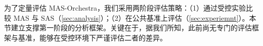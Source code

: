 
为了定量评估 MAS-Orchestra，我们采用两阶段评估策略：（1）通过受控实验比较 MAS 与 SAS（\cref{sec:analysis}）；（2）在公共基准上评估（\cref{sec:experiemnt}）。本节建立支撑第一阶段的分析框架。关键在于，据我们所知，此前尚无专门的评估框架与基准，能够在受控环境下严谨评估二者的差异。





